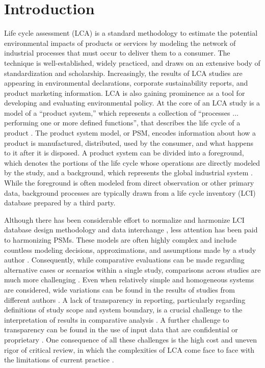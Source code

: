 \section{Introduction}

Life cycle assessment (LCA) is a standard methodology to estimate the potential environmental impacts of products or services by modeling the network of industrial processes that must occur to deliver 
them to a consumer.  The technique is well-established, widely practiced, and draws on an extensive body of standardization and scholarship.
Increasingly, the results of LCA studies are appearing in environmental declarations, corporate sustainability reports, and product marketing information.  LCA is also gaining prominence as a tool for developing and evaluating environmental policy.  
%
At the core of an LCA study is a model of a ``product system,'' which represents a collection of ``processes $\ldots$ performing one or more defined functions'', that describes the life cycle of a product \citep{iso14044}.  The product system model, or PSM, encodes information about how a product is manufactured, distributed, used by the consumer, and what happens to it after it is disposed.  A product system can be divided into a foreground, which denotes the portions of the life cycle whose operations are directly modeled by the study, and a background, which represents the global industrial system \citep{SETAC_inventory_1998}.  While the foreground is often modeled from direct observation or other primary data, background processes are typically drawn from a life cycle inventory (LCI) database prepared by a third party.

Although there has been considerable effort to normalize and harmonize 
LCI database design methodology and data interchange \citep{UNEP_2011, JRC_ILCD_ELCD_2013, Mila_e_Canals_2015, Ingwersen_JLCA_2015}, less attention has been paid to harmonizing PSMs.  These models are often highly complex and include countless modeling decisions, approximations, and assumptions made by a study author \citep{Lloyd2007, reap2008_I}.  Consequently, while comparative evaluations can be made regarding alternative cases or scenarios within a single study, comparisons across studies are much more challenging \citep{Heath2012, Henriksson2014}.  Even when relatively simple and homogeneous systems are considered, wide variations can be found in the results of studies from different authors \citep{van_der_Harst_2013, Turconi_2013}.
A lack of transparency in reporting, particularly regarding definitions of study scope and system boundary,
is a crucial challenge to the interpretation of results in comparative analysis \citep{Cleary2009, Laurent_2014}.  A further challenge to transparency can be found in the use of input data that are confidential or proprietary \citep{Kuczenski_2017}.  One consequence of all these challenges is the high cost and uneven rigor of critical review, in which the complexities of LCA come face to face with the limitations of current practice \citep{Curran2014}.  


